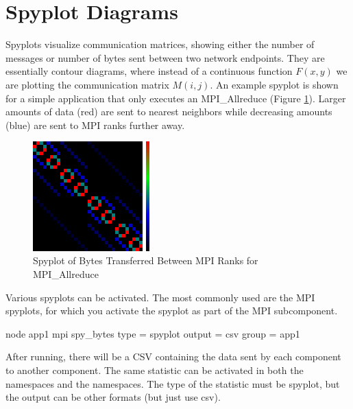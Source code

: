 

\section{Spyplot Diagrams}
\label{sec:tutorials:spyplot}

Spyplots visualize communication matrices, showing either the number of messages or number of bytes sent between two network endpoints.
They are essentially contour diagrams, where instead of a continuous function $F(x,y)$ we are plotting the communication matrix $M(i,j)$.
An example spyplot is shown for a simple application that only executes an MPI\_Allreduce (Figure \ref{fig:spyplot}).
Larger amounts of data (red) are sent to nearest neighbors while decreasing amounts (blue) are sent to MPI ranks further away.

\begin{figure}[h]
\centering
\includegraphics[width=0.4\textwidth]{figures/spyplot/mpi_spyplot.png}
\caption{Spyplot of Bytes Transferred Between MPI Ranks for MPI\_Allreduce}
\label{fig:spyplot}
\end{figure}

Various spyplots can be activated.
The most commonly used are the MPI spyplots, for which you activate the spyplot as part of the MPI subcomponent.

\begin{ViFile}
node {
  app1 {
    mpi {
      spy_bytes {
        type = spyplot
        output = csv
        group = app1
      }
    }
  }
}
\end{ViFile}
After running, there will be a CSV containing the data sent by each component to another component.
The same statistic can be activated in both the  namespaces and the  namespaces.
The type of the statistic must be spyplot, but the output can be other formats (but just use csv).

